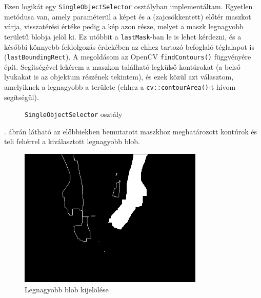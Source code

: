 Ezen logikát egy \texttt{SingleObjectSelector} osztályban implementáltam. Egyetlen metódusa van, amely paraméterül a képet és a (zajcsökkentett) előtér maszkot várja, visszatérési értéke pedig a kép azon része, melyet a maszk legnagyobb területű blobja jelöl ki. Ez utóbbit a \texttt{lastMask}-ban le is lehet kérdezni, és a későbbi könnyebb feldolgozás érdekében az ehhez tartozó befoglaló téglalapot is (\texttt{lastBoundingRect}). A megoldásom az OpenCV \texttt{findContours()} függvényére épít. Segítségével lekérem a maszkon található legkülső kontúrokat (a belső lyukakat is az objektum részének tekintem), és ezek közül azt választom, amelyiknek a legnagyobb a területe (ehhez a \texttt{cv::contourArea()}-t hívom segítségül).

\begin{figure}[tbh]
\centering


\caption{\texttt{SingleObjectSelector} osztály \label{fig:cd:singleobjectselector}}
\end{figure}

. ábrán látható az előbbiekben bemutatott maszkhoz meghatározott kontúrok és teli fehérrel a kiválasztott legnagyobb blob.

\begin{figure}[tbh]
    \centering
    \includegraphics[width=250pt]{figures/mask343_contours.png}
    \caption{Legnagyobb blob kijelölése \label{fig:maxArea}}
\end{figure}

